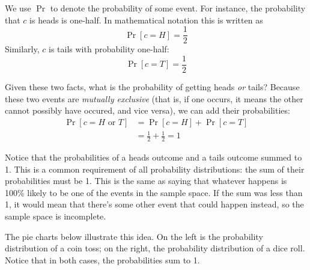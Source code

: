 We use $\Pr$ to denote the probability of some event. For instance, the 
probability that $c$ is heads is one-half. In mathematical notation this
is written as
\[
    \Pr[c=H] = \frac{1}{2}
\]
Similarly, $c$ is tails with probability one-half:
\[
    \Pr[c=T] = \frac{1}{2}
\]

Given these two facts, what is the probability of getting heads \emph{or}
tails? Because these two events are \emph{mutually exclusive} (that is, 
if one occurs, it means the other cannot possibly have occured, and 
vice versa), we can add their probabilities:
\begin{align*}
    \Pr[c = H \text{ or } T] &= \Pr[c=H] + \Pr[c=T] \\
    &= \frac{1}{2} + \frac{1}{2} = 1
\end{align*}

\setlength\fboxsep{1em}        
\begin{center}
\end{center}

Notice that the probabilities of a heads outcome and a tails outcome summed to 1. 
This is a common requirement of all probability distributions: the sum of their 
probabilities must be 1. This is the same as saying that whatever happens is 100\% likely to be one of the events 
in the sample space. If the sum was less than 1, it 
would mean that there's some other event that could happen instead, so the sample space
is incomplete.

The pie charts below illustrate this idea. On the left is the probability 
distribution of a coin toss; on the right, the probability distribution 
of a dice roll. Notice that in both cases, the probabilities sum to 1.

